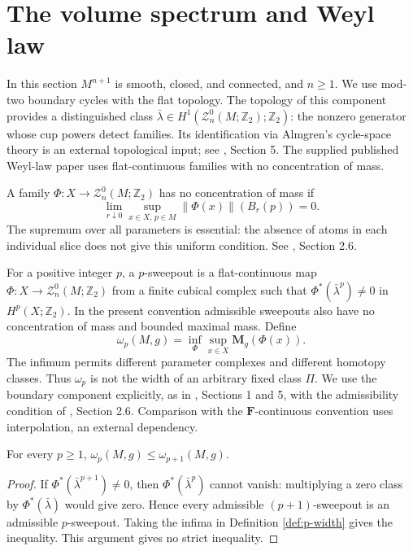 \chapter{The volume spectrum and Weyl law}\label{sec:volume-spectrum}
In this section $M^{n+1}$ is smooth, closed, and connected, and $n\geq1$. We use mod-two boundary cycles with the flat topology. The topology of this component provides a distinguished class $\bar\lambda\in H^1(\mathcal Z_n^0(M;\mathbb Z_2);\mathbb Z_2)$: the nonzero generator whose cup powers detect families. Its identification via Almgren's cycle-space theory is an external topological input; see \cite{MNIndex}, Section 5. The supplied published Weyl-law paper \cite{LMN} uses flat-continuous families with no concentration of mass.

\begin{definition}\label{def:no-concentration}
A family $\Phi:X\to\mathcal Z_n^0(M;\mathbb Z_2)$ has no concentration of mass if
\[
 \lim_{r\downarrow0}\sup_{x\in X,\,p\in M}
 \|\Phi(x)\|(B_r(p))=0.
\]
The supremum over all parameters is essential: the absence of atoms in each individual slice does not give this uniform condition. See \cite{LMN}, Section 2.6.
\end{definition}

\begin{definition}\label{def:p-width}
For a positive integer $p$, a $p$-sweepout is a flat-continuous map $\Phi:X\to\mathcal Z_n^0(M;\mathbb Z_2)$ from a finite cubical complex such that
$\Phi^*(\bar\lambda^p)\neq0$ in $H^p(X;\mathbb Z_2)$.
In the present convention admissible sweepouts also have no concentration of mass and bounded maximal mass. Define
\[
 \omega_p(M,g)=\inf_\Phi\sup_{x\in X}\mathbf M_g(\Phi(x)).
\]
The infimum permits different parameter complexes and different homotopy classes. Thus $\omega_p$ is not the width of an arbitrary fixed class $\Pi$. We use the boundary component explicitly, as in \cite{MNIndex}, Sections 1 and 5, with the admissibility condition of \cite{LMN}, Section 2.6. Comparison with the $\mathbf F$-continuous convention uses interpolation, an external dependency.
\end{definition}

\begin{lemma}\label{lem:width-monotonicity}
For every $p\geq1$, $\omega_p(M,g)\leq\omega_{p+1}(M,g)$.
\end{lemma}
\begin{proof}
If $\Phi^*(\bar\lambda^{p+1})\neq0$, then $\Phi^*(\bar\lambda^p)$ cannot vanish: multiplying a zero class by $\Phi^*(\bar\lambda)$ would give zero. Hence every admissible $(p+1)$-sweepout is an admissible $p$-sweepout. Taking the infima in Definition \ref{def:p-width} gives the inequality. This argument gives no strict inequality.
\end{proof}

